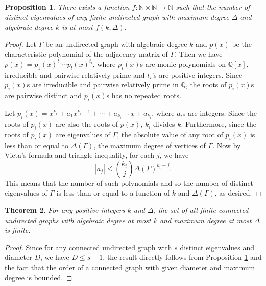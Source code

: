 \documentclass[12pt,a4paper]{article}
\newtheorem{thm}{Theorem}[section]
\newtheorem{pro}[thm]{Proposition}
\def \leq {\leqslant}
\begin{document}
	\begin{pro}\label{abdollahi}
		There exists a function $f:\mathbb{N}\times\mathbb{N}\rightarrow\mathbb{N}$ such that the number of distinct eigenvalues of any finite undirected graph with maximum degree $\Delta$ and algebraic degree $k$ is at most $f(k,\Delta)$.
	\end{pro}
	\begin{proof}
		Let $\Gamma$ be an undirected graph with algebraic degree $k$ and  $p(x)$ be the characteristic polynomial of the adjacency matrix of $\Gamma$. Then we have $p(x)=p_1(x)^{t_1}\cdots p_l(x)^{t_l}$, where $p_i(x)$s are monic polynomials on $\mathbb Q[x]$, irreducible and pairwise relatively prime and $t_i$'s are positive integers. Since $p_i(x)$s are irreducible and pairwise relatively prime in $\mathbb{Q}$, the roots of $p_i(x)$s are pairwise distinct and $p_i(x)$s has no repeated roots. 
		
		Let $p_i(x)=x^{k_i}+a_1x^{k_i-1}+\cdots+a_{k_i-1}x+a_{k_i}$, where $a_i$s are integers. 
		Since the roots of $p_i(x)$ are also the roots of $p(x)$, $k_i$ divides $k$. Furthermore, since the roots of $p_i(x)$ are eigenvalues of $\Gamma$, the absolute value of any root of $p_i(x)$ is less than or equal to  $\Delta(\Gamma)$, the maximum degree of vertices of $\Gamma$. Now by Vieta's formula and triangle inequality, for each $j$, we have  $$| a_j|\leq \binom{k_i}{j}\Delta(\Gamma)^{k_i-j}.$$
		This means that the number of such polynomials and so the number of distinct eigenvalues
		of $\Gamma$ is less than or equal to a function of $k$ and $\Delta(\Gamma)$, as desired.
	\end{proof}
	\begin{thm}\label{finite}
		For any positive integers $k$ and $\Delta$, the set of all finite connected undirected graphs with algebraic degree at most $k$ and maximum degree at most $\Delta$ is finite.
	\end{thm}
	\begin{proof}
		Since for any connected undirected graph with $s$ distinct eigenvalues and diameter $D$, we have $D\leq s-1$, the result directly follows from Proposition \ref{abdollahi} and the fact that the order of a connected graph with given diameter and maximum degree is bounded.
	\end{proof}
	
\end{document}
